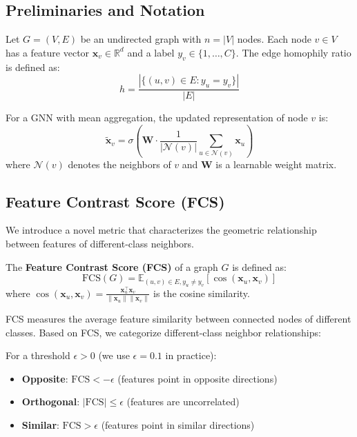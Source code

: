 \subsection{Preliminaries and Notation}

Let $G = (V, E)$ be an undirected graph with $n = |V|$ nodes. Each node $v \in V$ has a feature vector $\mathbf{x}_v \in \mathbb{R}^d$ and a label $y_v \in \{1, \ldots, C\}$. The edge homophily ratio is defined as:
\begin{equation}
    h = \frac{|\{(u,v) \in E : y_u = y_v\}|}{|E|}
\end{equation}

For a GNN with mean aggregation, the updated representation of node $v$ is:
\begin{equation}
    \tilde{\mathbf{x}}_v = \sigma\left(\mathbf{W} \cdot \frac{1}{|\mathcal{N}(v)|} \sum_{u \in \mathcal{N}(v)} \mathbf{x}_u\right)
\end{equation}
where $\mathcal{N}(v)$ denotes the neighbors of $v$ and $\mathbf{W}$ is a learnable weight matrix.

\subsection{Feature Contrast Score (FCS)}

We introduce a novel metric that characterizes the geometric relationship between features of different-class neighbors.

\begin{definition}
\label{def:fcs}
The \textbf{Feature Contrast Score (FCS)} of a graph $G$ is defined as:
\begin{equation}
    \text{FCS}(G) = \mathbb{E}_{(u,v) \in E, y_u \neq y_v}\left[\cos(\mathbf{x}_u, \mathbf{x}_v)\right]
\end{equation}
where $\cos(\mathbf{x}_u, \mathbf{x}_v) = \frac{\mathbf{x}_u^\top \mathbf{x}_v}{\|\mathbf{x}_u\| \|\mathbf{x}_v\|}$ is the cosine similarity.
\end{definition}

FCS measures the average feature similarity between connected nodes of different classes. Based on FCS, we categorize different-class neighbor relationships:

\begin{definition}
\label{def:neighbor_types}
For a threshold $\epsilon > 0$ (we use $\epsilon = 0.1$ in practice):
\begin{itemize}
    \item \textbf{Opposite}: $\text{FCS} < -\epsilon$ (features point in opposite directions)
    \item \textbf{Orthogonal}: $|\text{FCS}| \leq \epsilon$ (features are uncorrelated)
    \item \textbf{Similar}: $\text{FCS} > \epsilon$ (features point in similar directions)
\end{itemize}
\end{definition}

